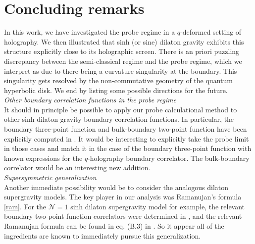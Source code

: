 \documentclass[a4paper,titlepage,12pt]{article}
\numberwithin{equation}{section}
\begin{document}
\section{Concluding remarks}
\label{s:concl}
In this work, we have investigated the probe regime in a $q$-deformed setting of holography. We then illustrated that sinh (or sine) dilaton gravity exhibits this structure explicitly close to its holographic screen. There is an priori puzzling discrepancy between the semi-classical regime and the probe regime, which we interpret as due to there being a curvature singularity at the boundary. This singularity gets resolved by the non-commutative geometry of the quantum hyperbolic disk. We end by listing some possible directions for the future. \\

\textit{Other boundary correlation functions in the probe regime} \\
It should in principle be possible to apply our probe calculational method to other sinh dilaton gravity boundary correlation functions. In particular, the boundary three-point function and bulk-boundary two-point function have been explicitly computed in \cite{Mertens:2020hbs}. It would be interesting to explicitly take the probe limit in those cases and match it in the case of the boundary three-point function with known expressions for the $q$-holography boundary correlator. The bulk-boundary correlator would be an interesting new addition. \\

\textit{Supersymmetric generalization} \\
Another immediate possibility would be to consider the analogous dilaton supergravity models. The key player in our analysis was Ramanujan's formula \eqref{ram}. For the $\mathcal{N}=1$ sinh dilaton supergravity model for example, the relevant boundary two-point function correlators were determined in \cite{Fan:2021bwt}, and the relevant Ramanujan formula can be found in eq. (B.3) in \cite{Hadasz:2013bwa}. So it appear all of the ingredients are known to immediately pursue this generalization. \\
\end{document}
